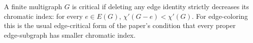\begin{definition}
A finite multigraph $G$ is critical if deleting any edge identity strictly
decreases its chromatic index: for every $e\in E(G)$,
$\chi'(G-e)<\chi'(G)$.  For edge-coloring this is the usual edge-critical
form of the paper's condition that every proper edge-subgraph has smaller
chromatic index.
\end{definition}
